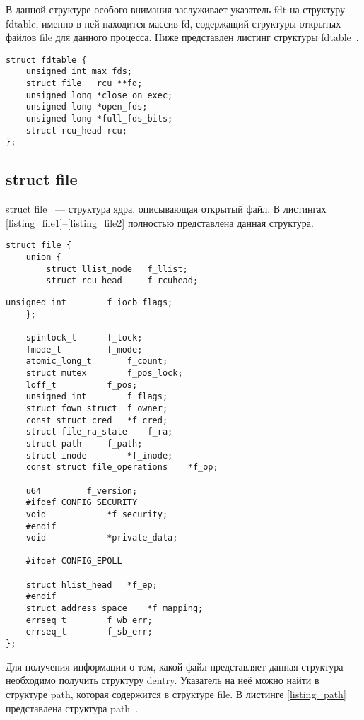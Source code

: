 В данной структуре особого внимания заслуживает указатель fdt на структуру fdtable, именно в ней находится массив fd, содержащий структуры открытых файлов file для данного процесса.
Ниже представлен листинг структуры fdtable~\cite{lsc}.
\begin{center}
	\begin{lstlisting}[label=listing_fdtable,caption=Структура fdtable]
struct fdtable {
	unsigned int max_fds;
	struct file __rcu **fd;
	unsigned long *close_on_exec;
	unsigned long *open_fds;
	unsigned long *full_fds_bits;
	struct rcu_head rcu;
};
\end{lstlisting}
\end{center}

\subsection{struct file}

struct file~\cite{file} --- структура ядра, описывающая открытый файл. В листингах \ref{listing_file1}--\ref{listing_file2} полностью представлена данная структура.
\begin{center}
	\begin{lstlisting}[label=listing_file1,caption=Структура file]
struct file {
	union {
		struct llist_node	f_llist;
		struct rcu_head 	f_rcuhead;
\end{lstlisting}
\end{center}

\begin{center}
	\begin{lstlisting}[label=listing_file2,caption=Структура file]
		unsigned int 		f_iocb_flags;
	};
	
	spinlock_t		f_lock;
	fmode_t			f_mode;
	atomic_long_t		f_count;
	struct mutex		f_pos_lock;
	loff_t			f_pos;
	unsigned int		f_flags;
	struct fown_struct	f_owner;
	const struct cred	*f_cred;
	struct file_ra_state	f_ra;
	struct path		f_path;
	struct inode		*f_inode;
	const struct file_operations	*f_op;
	
	u64			f_version;
	#ifdef CONFIG_SECURITY
	void			*f_security;
	#endif
	void			*private_data;
	
	#ifdef CONFIG_EPOLL
	
	struct hlist_head	*f_ep;
	#endif
	struct address_space	*f_mapping;
	errseq_t		f_wb_err;
	errseq_t		f_sb_err;
};
	\end{lstlisting}
\end{center}

Для получения информации о том, какой файл представляет данная структура необходимо получить структуру dentry. Указатель на неё можно найти в структуре path, которая содержится в структуре file.
В листинге \ref{listing_path} представлена структура path~\cite{lsc}.

